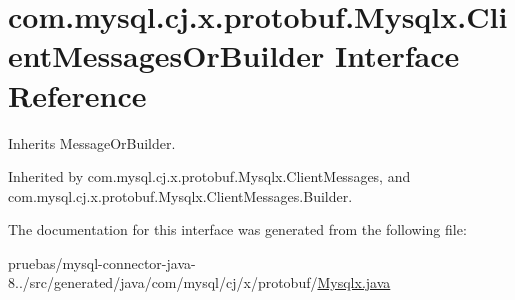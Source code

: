 \hypertarget{interfacecom_1_1mysql_1_1cj_1_1x_1_1protobuf_1_1_mysqlx_1_1_client_messages_or_builder}{}\section{com.\+mysql.\+cj.\+x.\+protobuf.\+Mysqlx.\+Client\+Messages\+Or\+Builder Interface Reference}
\label{interfacecom_1_1mysql_1_1cj_1_1x_1_1protobuf_1_1_mysqlx_1_1_client_messages_or_builder}


Inherits Message\+Or\+Builder.



Inherited by com.\+mysql.\+cj.\+x.\+protobuf.\+Mysqlx.\+Client\+Messages, and com.\+mysql.\+cj.\+x.\+protobuf.\+Mysqlx.\+Client\+Messages.\+Builder.



The documentation for this interface was generated from the following file\+:\begin{DoxyCompactItemize}
\item 
pruebas/mysql-\/connector-\/java-\/8../src/generated/java/com/mysql/cj/x/protobuf/\mbox{\hyperlink{_mysqlx_8java}{Mysqlx.\+java}}\end{DoxyCompactItemize}
